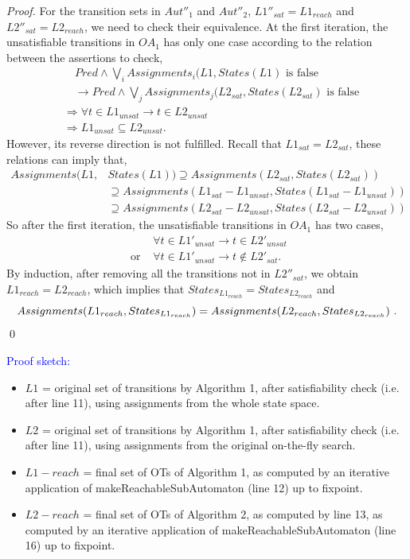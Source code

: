 \documentclass[smallcondensed]{svjour3}
\newcommand{\ERIC}[1]{\textcolor{blue}{#1}}
\begin{document}
\begin{proof}
For the transition sets in $Aut''_1$ and $Aut''_2$, $L1''_{sat}=L1_{reach}$ and $L2''_{sat}=L2_{reach}$, we need to check their equivalence.
At the first iteration, the unsatisfiable transitions in $OA_1$ has only one case according to the relation between the assertions to check,
\begin{align*}
&\quad Pred\wedge \bigvee_i Assignments_i(L1, States(L1) \text{ is false}\\
&\quad\longrightarrow Pred\wedge \bigvee_j Assignments_j(L2_{sat}, States(L2_{sat})\text{ is false}\\
&\Rightarrow \forall t\in L1_{unsat} \longrightarrow t\in L2_{unsat}\\
&\Rightarrow L1_{unsat}\subseteq L2_{unsat}.
\end{align*}
However, its reverse direction is not fulfilled. Recall that $L1_{sat}=L2_{sat}$, these relations can imply that,
\begin{align*}
Assignments(L1, &States(L1))\supseteq Assignments(L2_{sat}, States(L2_{sat}))\\
&\supseteq Assignments(L1_{sat}-L1_{unsat}, States(L1_{sat}-L1_{unsat}))\\
&\supseteq Assignments(L2_{sat}-L2_{unsat}, States(L2_{sat}-L2_{unsat}))
\end{align*}
So after the first iteration, the unsatisfiable transitions in $OA_1$ has two cases,
\begin{align*}
&\forall t\in L1'_{unsat} \longrightarrow t\in L2'_{unsat}\\
\text{ or }&\forall t\in L1'_{unsat} \longrightarrow t\notin L2'_{sat}.
\end{align*}
By induction, after removing all the transitions not in $L2''_{sat}$, we obtain  $L1_{reach}=L2_{reach}$, which implies that $States_{L1_{reach}}=States_{L2_{reach}}$ and
$$Assignments\\(L1_{reach},States_{L1_{reach}})=Assignments(L2_{reach},States_{L2_{reach}})\ .$$
\hfill\qed
\end{proof}

\ERIC{Proof sketch:}
  
  \begin{itemize}
   \item $L1$ = original set of transitions by Algorithm 1, after
      satisfiability check (i.e. after line 11), using assignments
      from the whole state space.
   \item $L2$ = original set of transitions by Algorithm 1, after
      satisfiability check (i.e. after line 11), using assignments
      from the original on-the-fly search.

    \item $L1-reach$ = final set of OTs of Algorithm 1, as computed
        by an iterative application of makeReachableSubAutomaton (line
        12) up to fixpoint.
      \item $L2-reach$ = final set of OTs of Algorithm 2, as computed
          by line 13, as computed
        by an iterative application of makeReachableSubAutomaton (line
        16) up to fixpoint.
  \end{itemize}
\end{document}
